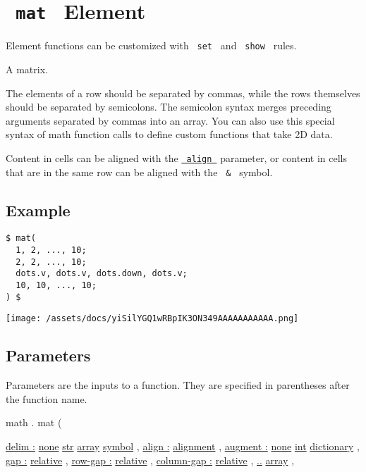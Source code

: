 \section{\texorpdfstring{\texttt{\ mat\ } {{ Element
}}}{ mat   Element }}\label{summary}

\label{element-tooltip}
Element functions can be customized with \texttt{\ set\ } and
\texttt{\ show\ } rules.

A matrix.

The elements of a row should be separated by commas, while the rows
themselves should be separated by semicolons. The semicolon syntax
merges preceding arguments separated by commas into an array. You can
also use this special syntax of math function calls to define custom
functions that take 2D data.

Content in cells can be aligned with the
\href{/docs/reference/math/mat/\#parameters-align}{\texttt{\ align\ }}
parameter, or content in cells that are in the same row can be aligned
with the \texttt{\ \&\ } symbol.

\subsection{Example}\label{example}

\begin{verbatim}
$ mat(
  1, 2, ..., 10;
  2, 2, ..., 10;
  dots.v, dots.v, dots.down, dots.v;
  10, 10, ..., 10;
) $
\end{verbatim}

\texttt{[image: /assets/docs/yiSilYGQ1wRBpIK3ON349AAAAAAAAAAA.png]}

\subsection{\texorpdfstring{{ Parameters
}}{ Parameters }}\label{parameters}

\label{parameters-tooltip}
Parameters are the inputs to a function. They are specified in
parentheses after the function name.

math { . } { mat } (

{ \hyperref[parameters-delim]{delim :}
\href{/docs/reference/foundations/none/}{none}
\href{/docs/reference/foundations/str/}{str}
\href{/docs/reference/foundations/array/}{array}
\href{/docs/reference/symbols/symbol/}{symbol} , } {
\hyperref[parameters-align]{align :}
\href{/docs/reference/layout/alignment/}{alignment} , } {
\hyperref[parameters-augment]{augment :}
\href{/docs/reference/foundations/none/}{none}
\href{/docs/reference/foundations/int/}{int}
\href{/docs/reference/foundations/dictionary/}{dictionary} , } {
\hyperref[parameters-gap]{gap :}
\href{/docs/reference/layout/relative/}{relative} , } {
\hyperref[parameters-row-gap]{row-gap :}
\href{/docs/reference/layout/relative/}{relative} , } {
\hyperref[parameters-column-gap]{column-gap :}
\href{/docs/reference/layout/relative/}{relative} , } {
\hyperref[parameters-rows]{..}
\href{/docs/reference/foundations/array/}{array} , }

